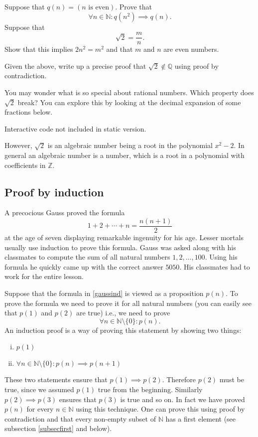 \begin{exercise}\label{exsqrt2notrat}
  Suppose that $q(n) = (n \text{ is even})$. Prove that
  $$
    \forall n\in \mathbb{N}: q(n^2) \implies q(n).
  $$
  Suppose that
  $$
    \sqrt{2} = \frac{m}{n}.
  $$
  Show that this implies $2 n^2 = m^2$ and that $m$ and $n$ are even numbers.

  Given the above, write up a precise proof that $\sqrt{2}\not\in \mathbb{Q}$
  using proof by contradiction.

  You may wonder what is so special about rational numbers. Which property does
  $\sqrt{2}$ break? You can explore this by looking at the decimal expansion of
  some fractions below.

  \begin{sage} Interactive code not included in static version.\end{sage}

  However, $\sqrt{2}$ is an algebraic number being a root in the
  polynomial $x^2 - 2$. In general an algebraic number is a number,
  which is a root in a polynomial with coefficients in $\mathbb{Z}$.

\end{exercise}

\subsection{Proof by induction}

A precocious Gauss proved the formula
\begin{equation}\label{gaussind}
  1 + 2 + \cdots + n = \frac{n(n+1)}{2}
\end{equation}
at the age of seven displaying remarkable ingenuity for his age. Lesser
mortals usually use induction to prove this formula. Gauss was asked
along with his classmates to compute the sum of all natural numbers
$1, 2, \dots, 100$. Using his formula he quickly came up with the correct
answer $5050$. His classmates had to work for the entire lesson.

Suppose that the formula in \eqref{gaussind} is viewed as a
proposition $p(n)$. To prove the formula we need to prove it for all
natural numbers (you can easily see that $p(1)$ and $p(2)$ are true) i.e.,
we need to prove
$$
  \forall n\in \mathbb{N}\setminus\{0\}: p(n).
$$
An induction proof is a way of proving this statement by showing two things:
\begin{enumerate}[(i)]
  \item
        $p(1)$
  \item
        $\forall n\in \mathbb{N}\setminus\{0\}: p(n)\implies p(n+1)$
\end{enumerate}
These two statements ensure that $p(1) \implies p(2)$. Therefore
$p(2)$ must be true, since we assumed $p(1)$ true from the
beginning. Similarly $p(2)\implies p(3)$ ensures that $p(3)$
is true and so on. In fact we have proved $p(n)$ for every $n\in \mathbb{N}$
using this technique. One can prove this using proof by
contradiction and that every non-empty subset
of $\mathbb{N}$ has a first element (see subsection \ref{subsecfirst} and below).

